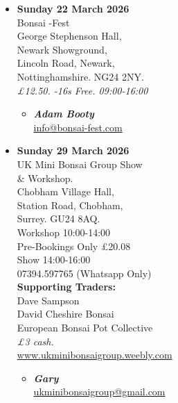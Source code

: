 \begin{itemize}
    \item \textbf{Sunday 22 March 2026}
    \\
    Bonsai -Fest \\
    George Stephenson Hall, \\
    Newark Showground, \\
    Lincoln Road, Newark, \\
    Nottinghamshire. NG24 2NY.
    \\
    \emph{£12.50. -16s Free. 09:00-16:00}
    \begin{itemize}
        \item \textbf{\emph{Adam Booty}} \\
        \href{mailto:info@bonsai-fest.com}{info@bonsai-fest.com} 
    \end{itemize}

    \item \textbf{Sunday 29 March 2026}
    \\
    UK Mini Bonsai Group Show \\
    \& Workshop. \\
    Chobham Village Hall, \\
    Station Road, Chobham, \\
    Surrey. GU24 8AQ. \\
    Workshop 10:00-14:00 \\
    Pre-Bookings Only £20.08 \\
    Show 14:00-16:00 \\
    07394.597765 (Whatsapp Only) \\
    \textbf{Supporting Traders:} \\
    Dave Sampson \\
    David Cheshire Bonsai \\
    European Bonsai Pot Collective
    \\
    \emph{£3 cash.}
    \\
    \href{https://www.ukminibonsaigroup.weebly.com}{www.ukminibonsaigroup.weebly.com}
    \begin{itemize}
        \item \textbf{\emph{Gary}} \\
        \href{mailto:ukminibonsaigroup@gmail.com}{ukminibonsaigroup@gmail.com} 
    \end{itemize}


\end{itemize}
